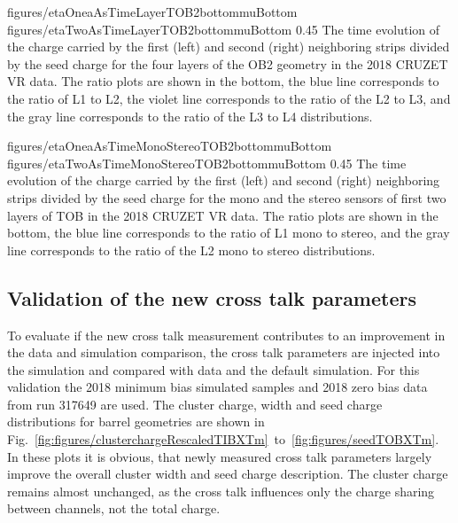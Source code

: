 

                 {figures/etaOneaAsTimeLayerTOB2bottommuBottom}
                 {figures/etaTwoAsTimeLayerTOB2bottommuBottom} %
                 {0.45}       %
                 { The time evolution of the charge carried by the first (left) and second (right) neighboring strips divided by the seed charge for the four layers of the OB2 geometry in the 2018 CRUZET VR data. The ratio plots are shown in the bottom, the blue line corresponds to the ratio of L1 to L2, the violet line corresponds to the ratio of the L2 to L3, and the gray line corresponds to the ratio of the L3 to L4 distributions. }


                 {figures/etaOneaAsTimeMonoStereoTOB2bottommuBottom}
                 {figures/etaTwoAsTimeMonoStereoTOB2bottommuBottom} %
                 {0.45}       %
                 { The time evolution of the charge carried by the first (left) and second (right) neighboring strips divided by the seed charge for the mono and the stereo sensors of first two layers of TOB in the 2018 CRUZET VR data. The ratio plots are shown in the bottom, the blue line corresponds to the ratio of L1 mono to stereo, and the gray line corresponds to the ratio of the L2 mono to stereo distributions. }


\subsection{Validation of the new cross talk parameters~\label{sec:validation}}

To evaluate if the new cross talk measurement contributes to an improvement in the data and simulation comparison,  the cross talk parameters are injected into the simulation and compared with data and the default simulation. For this validation the 2018 minimum bias simulated samples and 2018 zero bias data from run 317649 are used. The cluster charge, width and seed charge distributions for barrel geometries are shown in Fig.~\ref{fig:figures/clusterchargeRescaledTIBXTm}~to~\ref{fig:figures/seedTOBXTm}. In these plots it is obvious, that newly measured cross talk parameters largely improve the overall cluster width and seed charge description. The cluster charge remains almost unchanged, as the cross talk influences only the charge sharing between channels, not the total charge.  

